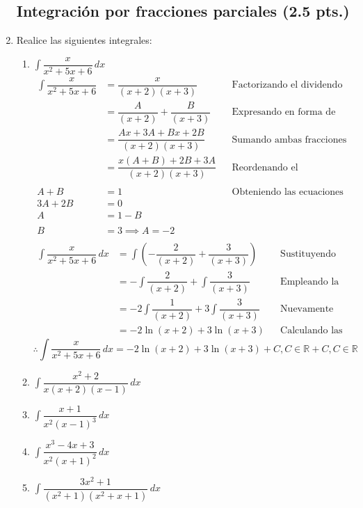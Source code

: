 \documentclass[letterpaper]{article}
\newcommand{\R}{\mathds{R}}
\renewcommand{\*}{\cdot}
\theoremstyle{definition}
\begin{document}
\begin{enumerate}
\subsection*{Integración por fracciones parciales (2.5 pts.)}
\item  Realice las siguientes integrales:
\begin{enumerate}
\item$\displaystyle \int \dfrac{x}{x^2 + 5x + 6} \, dx$
\begin{align*}
	\int \dfrac{x}{x^2 + 5x + 6} &= \dfrac{x}{(x+2)(x+3)} &&\text{Factorizando el dividendo}\\
	&= \dfrac{A}{(x+2)} + \dfrac{B}{(x+3)}&&\text{Expresando en forma de suma el dividendo}\\
	&= \dfrac{Ax + 3A + Bx + 2B}{(x+2)(x+3)} &&\text{Sumando ambas fracciones}\\
	&= \dfrac{x(A + B) + 2B + 3A}{(x+2)(x+3)} &&\text{Reordenando el numerador}\\ \\
	 A + B &= 1 &&\text{Obteniendo las ecuaciones }\\
	 3A + 2B &= 0 &&\text{ }\\
	 A &= 1 - B &&\text{ }\\ \\
	 B &= 3 \implies A = -2 &&\text{ }\\
\end{align*}
\begin{align*}
	\int \dfrac{x}{x^2 + 5x + 6} \, dx &= \int \left(-\dfrac{2}{(x+2)} + \dfrac{3}{(x+3)}\right) &&\text{Sustituyendo en la integral inicial}\\
	&= -\int\dfrac{2}{(x+2)} + \int\dfrac{3}{(x+3)} &&\text{Empleando la linealidad de la integral}\\
	&= -2\int\dfrac{1}{(x+2)} + 3\int\dfrac{3}{(x+3)} &&\text{Nuevamente empleando la linealidad de la integral}\\
	&= -2\ln(x + 2) + 3\ln(x+3) &&\text{Calculando las integrales que ya conocemos}
\end{align*}
\[ \therefore \int \dfrac{x}{x^2 + 5x + 6} \, dx =  -2\ln(x + 2) + 3\ln(x+3) + C, C \in \R + C, C \in \R \]
\item$\displaystyle \int \dfrac{x^2 +2}{x(x+2)(x-1)} \, dx$
\item$\displaystyle \int \dfrac{x + 1}{x^2(x-1)^3} \, dx$
\item$\displaystyle \int \dfrac{x^3 - 4x + 3}{x^2(x+1)^2} \, dx$
\item$\displaystyle \int  \dfrac{3x^2 + 1}{(x^2 +1 ) (x^2 + x +1)} \, dx$
\end{enumerate}

 \end{enumerate}
\end{document}

